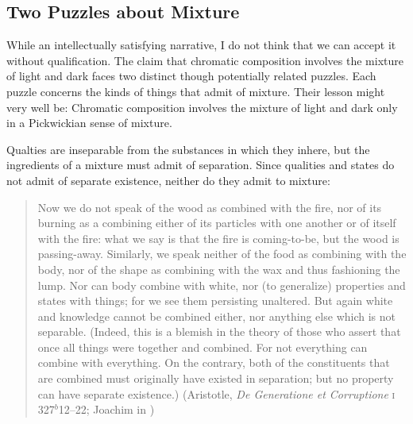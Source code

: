 

\subsection{Two Puzzles about Mixture} %
\label{sub:two_puzzles_about_mixture}

While an intellectually satisfying narrative, I do not think that we can accept it without qualification. The claim that chromatic composition involves the mixture of light and dark faces two distinct though potentially related puzzles. Each puzzle concerns the kinds of things that admit of mixture. Their lesson might very well be: Chromatic composition involves the mixture of light and dark only in a Pickwickian sense of mixture.

Qualties are inseparable from the substances in which they inhere, but the ingredients of a mixture must admit of separation. Since qualities and states do not admit of separate existence, neither do they admit to mixture:
\begin{quote}
	Now we do not speak of the wood as combined with the fire, nor of its burning as a combining either of its particles with one another or of itself with the fire: what we say is that the fire is coming-to-be, but the wood is passing-away. Similarly, we speak neither of the food as combining with the body, nor of the shape as combining with the wax and thus fashioning the lump. Nor can body combine with white, nor (to generalize) properties and states with things; for we see them persisting unaltered. But again white and knowledge cannot be combined either, nor anything else which is not separable. (Indeed, this is a blemish in the theory of those who assert that once all things were together and combined. For not everything can combine with everything. On the contrary, both of the constituents that are combined must originally have existed in separation; but no property can have separate existence.) (Aristotle, \emph{De Generatione et Corruptione} \textsc{i} 327\( ^{b} \)12--22; Joachim in \citealt[30--31]{Barnes:1984kx})
\end{quote}
